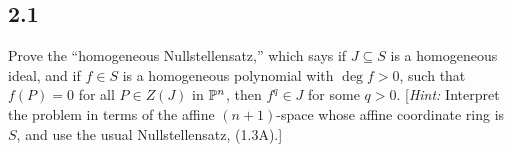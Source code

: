 \subsection*{2.1}

Prove the ``homogeneous Nullstellensatz,'' which says if $J \subseteq S$ is a homogeneous ideal, and if $f \in S$ is a homogeneous polynomial with $\deg f > 0$, such that $f(P) = 0$ for all $P \in Z(J)$ in $\P^n$, then $f^q \in J$ for some $q > 0$. [\textit{Hint:} Interpret the problem in terms of the affine $(n + 1)$-space whose affine coordinate ring is $S$, and use the usual Nullstellensatz, (1.3A).]
